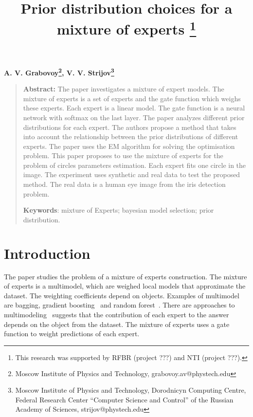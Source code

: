 \documentclass[12pt, twoside]{article}
\numberwithin{equation}{section}
\begin{document}
\title{\bf Prior distribution choices for a mixture of experts \thanks{This research was supported by RFBR (project ???) and NTI (project ???).}}
\date{}
\author{}
\maketitle

\begin{center}
\bf
A. V. Grabovoy\footnote{Moscow Institute of Physics and Technology, grabovoy.av@phystech.edu},
V. V. Strijov\footnote{Moscow Institute of Physics and Technology, Dorodnicyn Computing Centre, Federal Research Center “Computer Science and Control” of the Russian Academy of Sciences, strijov@phystech.edu}
\end{center}
{\centering\begin{quote}
\textbf{Abstract:} 
The paper investigates a mixture of expert models. 
The mixture of experts is a set of experts and the gate function which weighs these experts. Each expert is a linear model.
The gate function is a neural network with softmax on the last layer. 
The paper analyzes different prior distributions for each expert.
The authors propose a method that takes into account the relationship between the prior distributions of different experts.
The paper uses the EM algorithm for solving the optimisation problem.
This paper proposes to use the mixture of experts for the problem of circles parameters estimation.
Each expert fits one circle in the image.
The experiment uses synthetic and real data to test the proposed method.
The real data is a human eye image from the iris detection problem.


\smallskip
\textbf{Keywords}: mixture of Experts; bayesian model selection; prior distribution.

\smallskip
\end{quote}
}

\section{Introduction}
The paper studies the problem of a mixture of experts construction. The mixture of experts is a multimodel, which are weighed local models that approximate the dataset. The weighting coefficients depend on objects.
Examples of multimodel are bagging, gradient boosting~\cite{Tianqi2016} and random forest~\cite{Ishwaran2012}. There are approaches to multimodeling~\cite{Yuksel2012} suggests that the contribution of each expert to the answer depends on the object from the dataset. The mixture of experts uses a gate function to weight predictions of each expert.
\end{document}
